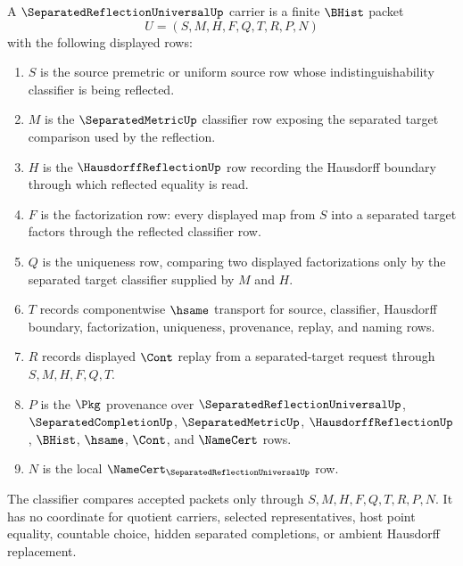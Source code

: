 \begin{definition}
\label{def:separated-reflection-universal-carrier}
A $\SeparatedReflectionUniversalUp$ carrier is a finite $\BHist$ packet
$$
U=(S,M,H,F,Q,T,R,P,N)
$$
with the following displayed rows:
\begin{enumerate}
\item $S$ is the source premetric or uniform source row whose indistinguishability classifier is being reflected.
\item $M$ is the $\SeparatedMetricUp$ classifier row exposing the separated target comparison used by the reflection.
\item $H$ is the $\HausdorffReflectionUp$ row recording the Hausdorff boundary through which reflected equality is read.
\item $F$ is the factorization row: every displayed map from $S$ into a separated target factors through the reflected classifier row.
\item $Q$ is the uniqueness row, comparing two displayed factorizations only by the separated target classifier supplied by $M$ and $H$.
\item $T$ records componentwise $\hsame$ transport for source, classifier, Hausdorff boundary, factorization, uniqueness, provenance, replay, and naming rows.
\item $R$ records displayed $\Cont$ replay from a separated-target request through $S,M,H,F,Q,T$.
\item $P$ is the $\Pkg$ provenance over $\SeparatedReflectionUniversalUp$, $\SeparatedCompletionUp$, $\SeparatedMetricUp$, $\HausdorffReflectionUp$, $\BHist$, $\hsame$, $\Cont$, and $\NameCert$ rows.
\item $N$ is the local $\NameCert_{\SeparatedReflectionUniversalUp}$ row.
\end{enumerate}
The classifier compares accepted packets only through $S,M,H,F,Q,T,R,P,N$. It has no coordinate for quotient carriers, selected representatives, host point equality, countable choice, hidden separated completions, or ambient Hausdorff replacement.
\end{definition}

